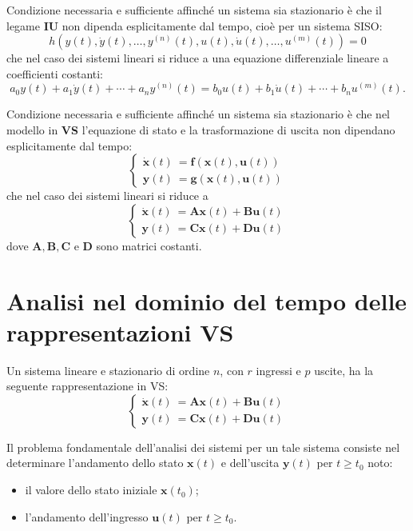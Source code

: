 \documentclass[a4paper]{article}
\renewcommand{\vec}{\bm}
\theoremstyle{definition}
\begin{document}
		Condizione necessaria e sufficiente affinché un sistema sia stazionario è che il legame \textbf{IU} non dipenda esplicitamente dal tempo, cioè per un sistema SISO:
		\[
			h \left( y(t), \dot{y}(t), \dots, y^{(n)}(t), u(t), \dot{u}(t),\dots, u^{(m)}(t) \right) = 0
		\]
		che nel caso dei sistemi lineari si riduce a una equazione differenziale lineare a
		coefficienti costanti:
		\[
			a_0 y(t) + a_1\dot{y}(t) + \cdots + a_n y^{(n)}(t) = 
			b_0 u(t) + b_1\dot{u}(t) + \cdots + b_n u^{(m)}(t).
		\]
		
		Condizione necessaria e sufficiente affinché un	sistema sia stazionario è che nel modello in \textbf{VS} l'equazione di stato e la trasformazione di uscita non dipendano esplicitamente dal tempo:
		\[
			\begin{cases}
				\vec{\dot{x}}(t)\ =\vec{f}(\vec{x}(t),\vec{u}(t)) \\
				\vec{y}(t)\ =\vec{g}(\vec{x}(t),\vec{u}(t)) 
			\end{cases}
		\]
		che nel caso dei sistemi lineari si riduce a
		\[
			\begin{cases}
				\vec{\dot{x}}(t)\ =\vec{A}\vec{x}(t)+ \vec{B}\vec{u}(t)  \\
				\vec{y}(t)\ =\vec{C}\vec{x}(t)+ \vec{D}\vec{u}(t) 
			\end{cases}
		\]
		dove $ \vec{A}, \vec{B}, \vec{C} $ e $ \vec{D} $ sono matrici costanti.
		
		\newpage
		
	\section{Analisi nel dominio del tempo delle rappresentazioni VS}
		Un sistema lineare e stazionario di ordine $ n $, con $ r $ ingressi e $ p $ uscite, ha la seguente rappresentazione in VS:
		\begin{equation}\label{eq:sys}
			\begin{cases}
				\vec{\dot{x}}(t)\ =\vec{A}\vec{x}(t)+ \vec{B}\vec{u}(t)  \\
				\vec{y}(t)\ =\vec{C}\vec{x}(t)+ \vec{D}\vec{u}(t) 
			\end{cases}
		\end{equation}
	
		Il problema fondamentale dell'analisi dei sistemi per un tale sistema consiste nel
		determinare l'andamento dello stato $ \vec{x}(t) $ e dell'uscita $ \vec{y}(t) $ per $ t \geq t_0 $ noto:
		\begin{itemize}
			\item il valore dello stato iniziale $ \vec{x}(t_0) $;
			\item l'andamento dell'ingresso $ \vec{u}(t) $ per $ t\geq t_0 $.
		\end{itemize}
\end{document}

